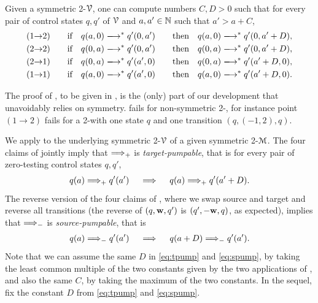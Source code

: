 \newcommand{\punkt}[2]{({#1}{\rightarrow}{#2})}
\begin{lemma}  \label{lem:targetpump}
Given a symmetric 2-\vass $\mathcal{V}$,
one can compute numbers $C, D >0$ 
such that for every pair of control states $q, q'$ of $\mathcal{V}$ and  
$a, a'\in\mathbb{N}$ such that $a' > a + C$,%
\begin{alignat*}{4}
&\punkt 1 2 \qquad
\text{if} \quad q(a,0)\step^* q'(0,a') \quad &&\text{then} \quad q(a,0) \step^* q'(0, a'+D),\\
&\punkt 2 2 \qquad
\text{if} \quad q(0,a)\step^* q'(0,a') \quad &&\text{then}  \quad  q(0,a) \step^* q'(0, a'+D),\\
&\punkt 2 1 \qquad
\text{if} \quad q(0,a)\step^* q'(a',0) \quad &&\text{then}  \quad  q(0,a) \step^* q'(a'+D, 0),\\
&\punkt 1 1 \qquad
\text{if} \quad q(a,0)\step^* q'(a',0) \quad &&\text{then}  \quad  q(a,0) \step^* q'(a'+D,0).
\end{alignat*}
\end{lemma}

\begin{remark}
The proof of ,
to be given in , is the (only) part of
our development that unavoidably relies on symmetry.
 fails for non-symmetric 2-\vass,
for instance point $\punkt 1 2$ fails 
for a 2-\vass with one state $q$ and one transition $(q,(-1,2),q)$.
\end{remark}

We apply  to the underlying 
symmetric 2-\vass $\mathcal{V}$ of a given symmetric 2-\cm $\mathcal{M}$.
The four claims of  jointly imply that 
$\Longrightarrow_{+}$ is \emph{target-pumpable}, 
that is for every pair of zero-testing control states $q, q'$,
\begin{align} \label{eq:tpump}
q(a)\Longrightarrow_{+} q'(a') \quad \implies  \quad  q(a) \Longrightarrow_{+} q'(a'+D).
\end{align}
The reverse version of the four claims of , 
where we swap source and target and reverse all transitions
(the reverse of $(q,\mathbf{w},q')$ is $(q',-\mathbf{w},q)$, as expected), 
implies that $\Longrightarrow_{-}$ is \emph{source-pumpable}, that is 
\begin{align} \label{eq:spump}
q(a)\Longrightarrow_{-} q'(a') \quad \implies  \quad  q(a+D) \Longrightarrow_{-} q'(a').
\end{align}
Note that we can assume the same $D$ in \eqref{eq:tpump} and 
\eqref{eq:spump}, by taking the least common multiple of the
two constants given by the two applications of ,
and also the same $C$, by taking the maximum of the two constants.
In the sequel, fix the constant 
$D$ from \eqref{eq:tpump} and \eqref{eq:spump}.


